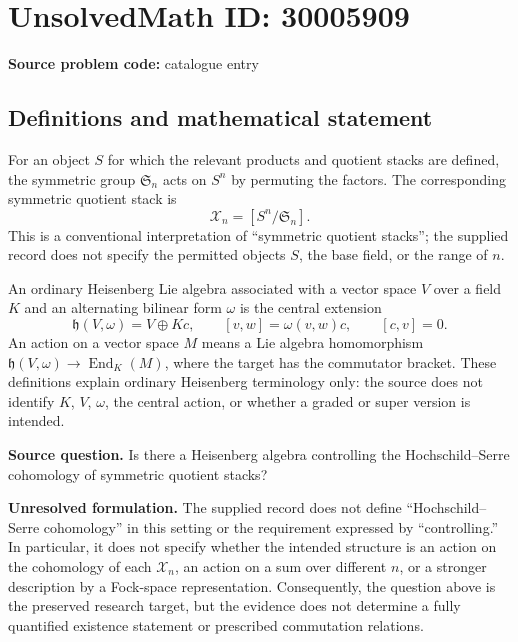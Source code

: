 \documentclass[11pt]{article}
\begin{document}
\section*{UnsolvedMath ID: 30005909}
\textbf{Source problem code:} catalogue entry
\subsection{Definitions and mathematical statement}
For an object \(S\) for which the relevant products and quotient stacks are defined, the symmetric group \(\mathfrak S_n\) acts on \(S^n\) by permuting the factors. The corresponding symmetric quotient stack is
\[
\mathcal X_n=[S^n/\mathfrak S_n].
\]
This is a conventional interpretation of ``symmetric quotient stacks''; the supplied record does not specify the permitted objects \(S\), the base field, or the range of \(n\).

An ordinary Heisenberg Lie algebra associated with a vector space \(V\) over a field \(K\) and an alternating bilinear form \(\omega\) is the central extension
\[
\mathfrak h(V,\omega)=V\oplus Kc,\qquad
[v,w]=\omega(v,w)c,\qquad [c,v]=0.
\]
An action on a vector space \(M\) means a Lie algebra homomorphism \(\mathfrak h(V,\omega)\to\operatorname{End}_K(M)\), where the target has the commutator bracket. These definitions explain ordinary Heisenberg terminology only: the source does not identify \(K\), \(V\), \(\omega\), the central action, or whether a graded or super version is intended.

\textbf{Source question.} Is there a Heisenberg algebra controlling the Hochschild--Serre cohomology of symmetric quotient stacks?

\textbf{Unresolved formulation.} The supplied record does not define ``Hochschild--Serre cohomology'' in this setting or the requirement expressed by ``controlling.'' In particular, it does not specify whether the intended structure is an action on the cohomology of each \(\mathcal X_n\), an action on a sum over different \(n\), or a stronger description by a Fock-space representation. Consequently, the question above is the preserved research target, but the evidence does not determine a fully quantified existence statement or prescribed commutation relations.
\end{document}
